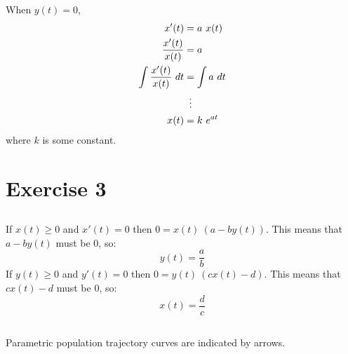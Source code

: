 \documentclass{article}
\begin{document}
\subsection{}
When $y(t)=0$,
\begin{align*}
  x'(t) &= a~x(t) \\
  \frac{x'(t)}{x(t)} &= a \\
  \int \frac{x'(t)}{x(t)}~dt &= \int a~dt \\
  &\setbox0\hbox{=}\mathrel{\makebox[\wd0]{\hfil\vdots\hfil}} \\
  x(t) &= k~e^{at} \\
\end{align*}
where $k$ is some constant.

\section{Exercise 3}
\subsection{}
If $x(t)\geq 0$ and $x'(t)=0$ then $0=x(t)~(a-by(t))$. This means that $a-by(t)$ must be 0, so:
\begin{equation*}
  y(t) = \frac{a}{b}
\end{equation*}
If $y(t)\geq 0$ and $y'(t)=0$ then $0=y(t)~(cx(t)-d)$. This means that $cx(t)-d$ must be 0, so:
\begin{equation*}
  x(t) = \frac{d}{c}
\end{equation*}
\subsection{}
Parametric population trajectory curves are indicated by arrows. \\
\begin{center}
\end{center}
\end{document}
